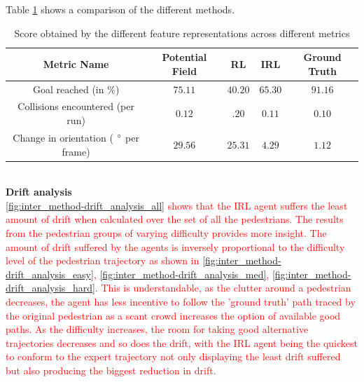 
Table \ref{tab:inter_method_numerical_results} shows a comparison of the different methods.
\begin{table}[htbp]
	\begin{center}
		\renewcommand{\arraystretch}{1.3}
		\begin{tabular}{|c|c|c|c|c|}
			\hline
			Metric Name & Potential Field & RL & IRL  &  Ground Truth \\
			\hline
			Goal reached (in $\%$) & $75.11$ & $40.20$ & $65.30$ & $91.16$\\
			Collisions encountered (per run) & $ 0.12$ & $.20$ & $0.11$ & $0.10$\\
			Change in orientation ( $\degree$ per frame) & $29.56$ & $25.31$ &  $4.29$ & $1.12$ \\
			\hline
		\end{tabular}
	\end{center}
	\caption{Score obtained by the different feature representations across different metrics}
	\label{tab:inter_method_numerical_results}
\end{table}\\
\textbf{Drift analysis}\\
\textcolor{red}{\autoref{fig:inter_method-drift_analysis_all} shows that the IRL agent suffers the least amount of drift when calculated over the set of all the pedestrians. The results from the pedestrian groups of varying difficulty provides more insight. The amount of drift suffered by the agents is inversely proportional to the difficulty level of the pedestrian trajectory as shown in \autoref{fig:inter_method-drift_analysis_easy}, \autoref{fig:inter_method-drift_analysis_med}, \autoref{fig:inter_method-drift_analysis_hard}. This is understandable, as the clutter around a pedestrian decreases, the agent has less incentive to follow the 'ground truth' path traced by the original pedestrian as a scant crowd increases the option of available good paths. As the difficulty increases, the room for taking good alternative trajectories decreases and so does the drift, with the IRL agent being the quickest to conform to the expert trajectory not only displaying the least drift suffered but also producing the biggest reduction in drift.}\\

